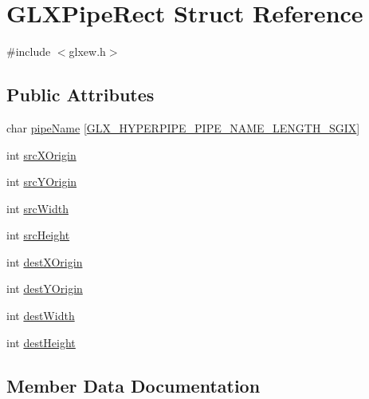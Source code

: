 \hypertarget{struct_g_l_x_pipe_rect}{}\section{G\+L\+X\+Pipe\+Rect Struct Reference}
\label{struct_g_l_x_pipe_rect}


{\ttfamily \#include $<$glxew.\+h$>$}

\subsection*{Public Attributes}
\begin{DoxyCompactItemize}
\item 
char \hyperlink{struct_g_l_x_pipe_rect_aa4c4f60e9647705ddefa10f95a37cb79}{pipe\+Name} \mbox{[}\hyperlink{glxew_8h_ae1c8261c0861010d8003a31d07e26005}{G\+L\+X\+\_\+\+H\+Y\+P\+E\+R\+P\+I\+P\+E\+\_\+\+P\+I\+P\+E\+\_\+\+N\+A\+M\+E\+\_\+\+L\+E\+N\+G\+T\+H\+\_\+\+S\+G\+IX}\mbox{]}
\item 
int \hyperlink{struct_g_l_x_pipe_rect_a9df2313c01f75d149e64f2ff467bc266}{src\+X\+Origin}
\item 
int \hyperlink{struct_g_l_x_pipe_rect_a1f7316dff7050ab2ce9d3d37f8c5450e}{src\+Y\+Origin}
\item 
int \hyperlink{struct_g_l_x_pipe_rect_a2c6c180a4dabb71076366e06a1c7d0ef}{src\+Width}
\item 
int \hyperlink{struct_g_l_x_pipe_rect_a35632524bce6bffa05f284a9b1c1b8ff}{src\+Height}
\item 
int \hyperlink{struct_g_l_x_pipe_rect_a8b7b941894ad3420326d7e9fa885bb71}{dest\+X\+Origin}
\item 
int \hyperlink{struct_g_l_x_pipe_rect_aef7766b02ef07c20a11e89da5878b469}{dest\+Y\+Origin}
\item 
int \hyperlink{struct_g_l_x_pipe_rect_a3c07991d2a8fb6e973eae834650b3dad}{dest\+Width}
\item 
int \hyperlink{struct_g_l_x_pipe_rect_a858b0ea6642e451495aff35cfefbd083}{dest\+Height}
\end{DoxyCompactItemize}


\subsection{Member Data Documentation}
\mbox{\label{struct_g_l_x_pipe_rect_a858b0ea6642e451495aff35cfefbd083}} 
